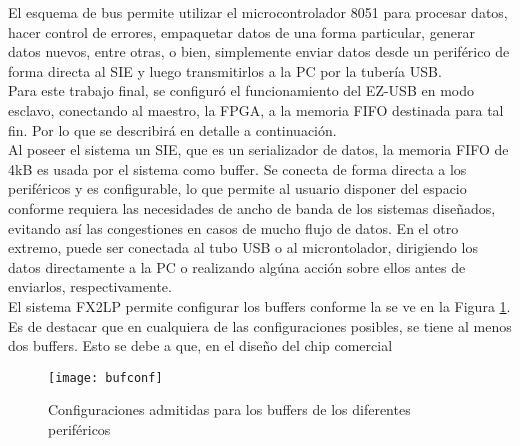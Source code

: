 	El esquema de bus permite utilizar el microcontrolador 8051 para procesar datos, hacer control de errores, empaquetar datos de una forma particular, generar datos nuevos, entre otras, o bien, simplemente enviar datos desde un periférico de forma directa al SIE y luego transmitirlos a la PC por la tubería USB.\\
	
	Para este trabajo final, se configuró el funcionamiento del EZ-USB en modo esclavo, conectando al maestro, la FPGA, a la memoria FIFO destinada para tal fin. Por lo que se describirá en detalle a continuación.\\
	
	Al poseer el sistema un SIE, que es un serializador de datos, la memoria FIFO de 4kB es usada por el sistema como buffer. Se conecta de forma directa a los periféricos y es configurable, lo que permite al usuario disponer del espacio conforme requiera las necesidades de ancho de banda de los sistemas diseñados, evitando así las congestiones en casos de mucho flujo de datos. En el otro extremo, puede ser conectada al tubo USB o al microntolador, dirigiendo los datos directamente a la PC o realizando algúna acción sobre ellos antes de enviarlos, respectivamente.\\
	
	El sistema FX2LP permite configurar los buffers conforme la se ve en la Figura \ref{epconfigs}. Es de destacar que en cualquiera de las configuraciones posibles, se tiene al menos dos buffers. Esto se debe a que, en el diseño del chip comercial
	
	\begin{figure}
		\centering
		\texttt{[image: bufconf]}
		\caption{Configuraciones admitidas para los buffers de los diferentes periféricos}
		\label{epconfigs}
	\end{figure}